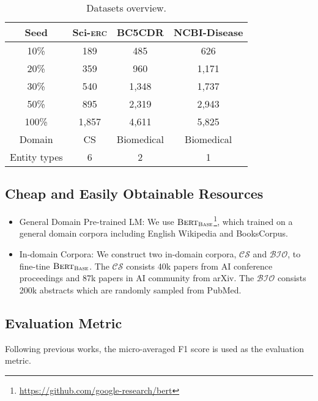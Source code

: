 \documentclass[10pt, conference, compsocconf]{IEEEtran}
\newcommand{\bert}{\textsc{Bert}\xspace}
\newcommand{\Scierc}{\textsc{S}ci-\textsc{erc}\xspace}
\newcommand{\bio}{$\mathcal{BIO}$\xspace}
\newcommand{\cs}{$\mathcal{CS}$\xspace}
\newcommand{\bertbase}{$\bert_{\textsc{Base}}$\xspace}
\begin{document}
\begin{table}[t!]
    \centering
    \caption{Datasets overview.}
    \label{tal:datasets}
	\begin{tabular}{c|ccc}
		\toprule
        Seed & \Scierc & BC5CDR  & NCBI-Disease \\
        \hline
        10\% & 189 & 485 & 626 \\
        20\% & 359 & 960 &  1,171\\
        30\% & 540 &  1,348 & 1,737\\
        50\% & 895 &  2,319 & 2,943\\
        100\% & 1,857&  4,611 & 5,825 \\
        \hline
        Domain & CS & Biomedical & Biomedical\\
        \hline
        Entity types & 6 & 2&  1\\
		\bottomrule
    \end{tabular}
\end{table}


\subsection{Cheap and Easily Obtainable Resources}
\begin{itemize}
    \item General Domain Pre-trained LM: We use \bertbase\footnote{\url{https://github.com/google-research/bert}},
        which trained on a general domain corpora including 
        English Wikipedia and BooksCorpus. 
    \item In-domain Corpora: We construct two in-domain corpora, \cs and \bio, to fine-tine \bertbase. 
      The \cs consists 40k papers from AI conference proceedings and 87k papers in AI community from arXiv.
       The \bio consists 200k abstracts which are randomly sampled from PubMed.
\end{itemize}
      
\subsection{Evaluation Metric} Following previous works\cite{zhou-etal-2019-dual,beltagy-etal-2019-scibert,chaudhary-etal-2019-little}, the micro-averaged F1 score is used as
the evaluation metric. 
\end{document}
